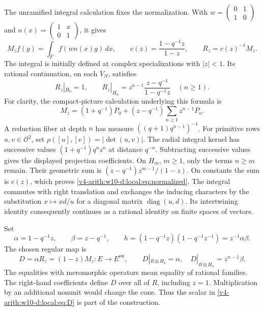 The unramified integral calculation fixes the normalization.
With
$w=\left(\begin{smallmatrix}0&1\\1&0\end{smallmatrix}\right)$ and
$n(x)=\left(\begin{smallmatrix}1&x\\0&1\end{smallmatrix}\right)$, it gives
\[
 M_zf(g)=\int_F f(wn(x)g)\,dx,\qquad
 c(z)=\frac{1-q^{-1}z}{1-z},\qquad R_z=c(z)^{-1}M_z.
\]
The integral is initially defined at complex specializations with $|z|<1$.
Its rational continuation, on each $V_N$, satisfies
\begin{equation}\label{v4-arith:w10-d:local:eq:normalized}
 R_z|_{H_0}=1,\qquad
 R_z|_{H_n}=z^{n-1}\frac{z-q^{-1}}{1-q^{-1}z}\quad(n\ge1).
\end{equation}
For clarity, the compact-picture calculation underlying this formula is
\[
 M_z=(1+q^{-1})P_0+(z-q^{-1})\sum_{n\ge1}z^{n-1}P_n.
\]
A reduction fiber at depth $n$ has measure
$((q+1)q^{n-1})^{-1}$.
For primitive rows $u,v\in\mathcal O^2$, set $\rho([u],[v])=|\det(u,v)|$.
The radial integral kernel has successive values
$(1+q^{-1})q^nz^n$ at distance $q^{-n}$.
Subtracting successive values gives the displayed projection coefficients.
On $H_m$, $m\ge1$, only the terms $n\ge m$ remain.
Their geometric sum is $(z-q^{-1})z^{m-1}/(1-z)$.
On constants the sum is $c(z)$, which proves \eqref{v4-arith:w10-d:local:eq:normalized}.
The integral commutes with right translation and exchanges the inducing characters
by the substitution $x\mapsto xd/u$ for a diagonal matrix $\operatorname{diag}(u,d)$.
Its intertwining identity consequently continues as a rational identity on finite spaces of vectors.

Set
\[
 \alpha=1-q^{-1}z,\qquad \beta=z-q^{-1},\qquad
 h=(1-q^{-1}z)(1-q^{-1}z^{-1})=z^{-1}\alpha\beta.
\]
The chosen regular map is
\begin{equation}\label{v4-arith:w10-d:local:eq:D}
 D=\alpha R_z=(1-z)M_z:E\longrightarrow E^\mathrm{sw},\qquad
 D|_{R\otimes H_0}=\alpha,\quad
 D|_{R\otimes H_n}=z^{n-1}\beta.
\end{equation}
The equalities with meromorphic operators mean equality of rational families.
The right-hand coefficients define $D$ over all of $R$, including $z=1$.
Multiplication by an additional nonunit would change the cone.
Thus the scalar in \eqref{v4-arith:w10-d:local:eq:D} is part of the construction.

